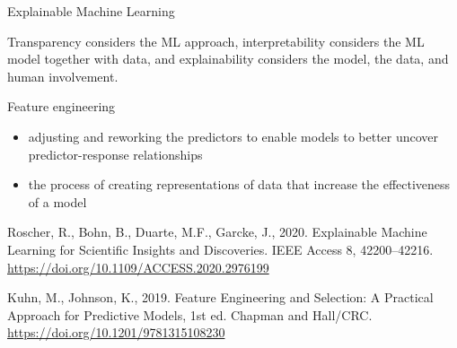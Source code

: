 \begin{frame}{Explainable Machine Learning}

\begin{block}{}
\alert{Transparency} considers the ML approach, \alert{interpretability} considers the ML model together with data, and \alert{explainability} considers the model, the data, and human involvement.
\end{block}

\begin{alertblock}{Feature engineering}
\begin{itemize}
    \item adjusting and reworking the predictors to enable models to better uncover predictor-response relationships
    \item the process of creating representations of data that increase the effectiveness of a model
\end{itemize}
\end{alertblock}




\raggedright\tiny  
\begin{inparaitem}
\item Roscher, R., Bohn, B., Duarte, M.F., Garcke, J., 2020. Explainable Machine Learning for Scientific Insights and Discoveries. IEEE Access 8, 42200–42216. \url{https://doi.org/10.1109/ACCESS.2020.2976199     }
\item Kuhn, M., Johnson, K., 2019. Feature Engineering and Selection: A Practical Approach for Predictive Models, 1st ed. Chapman and Hall/CRC. \url{https://doi.org/10.1201/9781315108230     }
\end{inparaitem}
\end{frame}



